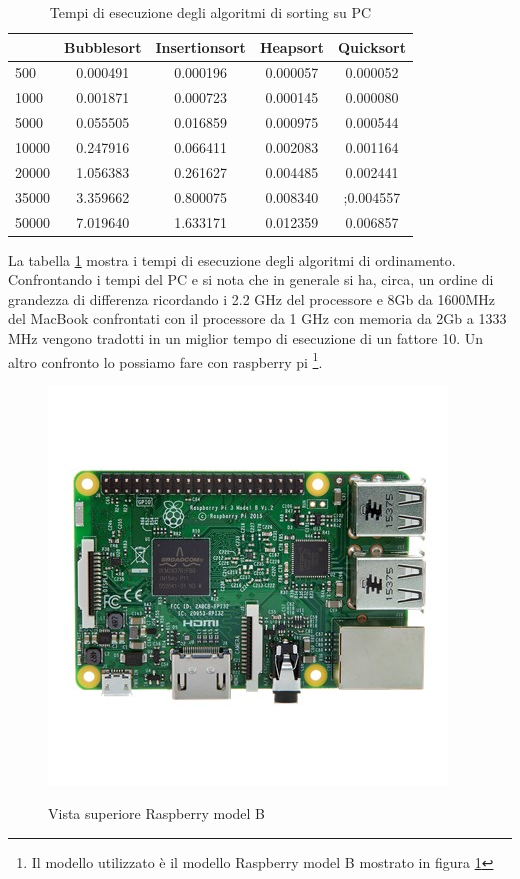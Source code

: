 \documentclass[12pt,a4paper]{report}
\begin{document}
	
	\begin{table}[h]
		\centering
		\begin{tabular}		{| l | c | c | c | c |}
		\hline
		      & Bubblesort & Insertionsort & Heapsort & Quicksort \\ \hline
500   & 0.000491      & 0.000196      & 0.000057 & 0.000052     \\ \hline
1000  & 0.001871	    & 0.000723      & 0.000145 & 0.000080     \\ \hline
5000  & 0.055505      & 0.016859     & 0.000975  & 0.000544   \\ \hline
10000 & 0.247916      & 0.066411     & 0.002083 & 0.001164     \\ \hline
20000 & 1.056383   & 0.261627      & 0.004485  & 0.002441   \\ \hline
35000 & 3.359662     & 0.800075     & 0.008340  & ;0.004557   \\ \hline
50000 & 7.019640     & 1.633171   & 0.012359  & 0.006857  \\ \hline

		\end{tabular}
		\caption{Tempi di esecuzione degli algoritmi di sorting su PC}
		\label{Fig:PcSort}
	\end{table}

La tabella \ref{Fig:PcSort} mostra i tempi di esecuzione degli algoritmi di ordinamento. Confrontando i tempi del PC e si nota che in generale si ha, circa, un ordine di grandezza di differenza ricordando i 2.2 GHz del processore e 8Gb da 1600MHz del MacBook confrontati con il processore da 1 GHz con memoria da 2Gb a 1333 MHz vengono tradotti in un miglior tempo di esecuzione di un fattore 10.
Un altro confronto lo possiamo fare con raspberry pi \footnote{Il modello utilizzato è il modello Raspberry model B mostrato in figura \ref{Fig:RBmodelB} }.

\begin{figure}[h]
\centering
	\includegraphics[scale=0.5]{RBTop.jpeg}
	\label{Fig:RBmodelB}
	\caption{Vista superiore Raspberry model B}
\end{figure}
\end{document}
